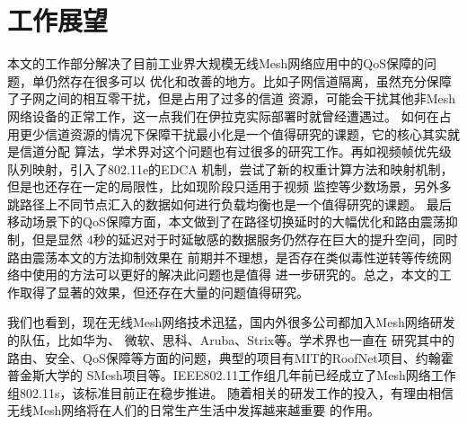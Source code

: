 \section{工作展望}
本文的工作部分解决了目前工业界大规模无线Mesh网络应用中的QoS保障的问题，单仍然存在很多可以
优化和改善的地方。比如子网信道隔离，虽然充分保障了子网之间的相互零干扰，但是占用了过多的信道
资源，可能会干扰其他非Mesh网络设备的正常工作，这一点我们在伊拉克实际部署时就曾经遭遇过。
如何在占用更少信道资源的情况下保障干扰最小化是一个值得研究的课题，它的核心其实就是信道分配
算法，学术界对这个问题也有过很多的研究工作。再如视频帧优先级队列映射，引入了802.11e的EDCA
机制，尝试了新的权重计算方法和映射机制，但是也还存在一定的局限性，比如现阶段只适用于视频
监控等少数场景，另外多跳路径上不同节点汇入的数据如何进行负载均衡也是一个值得研究的课题。
最后移动场景下的QoS保障方面，本文做到了在路径切换延时的大幅优化和路由震荡抑制，但是显然
4秒的延迟对于时延敏感的数据服务仍然存在巨大的提升空间，同时路由震荡本文的方法抑制效果在
前期并不理想，是否存在类似毒性逆转等传统网络中使用的方法可以更好的解决此问题也是值得
进一步研究的。总之，本文的工作取得了显著的效果，但还存在大量的问题值得研究。

我们也看到，现在无线Mesh网络技术迅猛，国内外很多公司都加入Mesh网络研发的队伍，比如华为、
微软、思科、Aruba、Strix等。学术界也一直在
研究其中的路由、安全、QoS保障等方面的问题，典型的项目有MIT的RoofNet项目、约翰霍普金斯大学的
SMesh项目等。IEEE802.11工作组几年前已经成立了Mesh网络工作组802.11s，该标准目前正在稳步推进。
随着相关的研发工作的投入，有理由相信无线Mesh网络将在人们的日常生产生活中发挥越来越重要
的作用。

